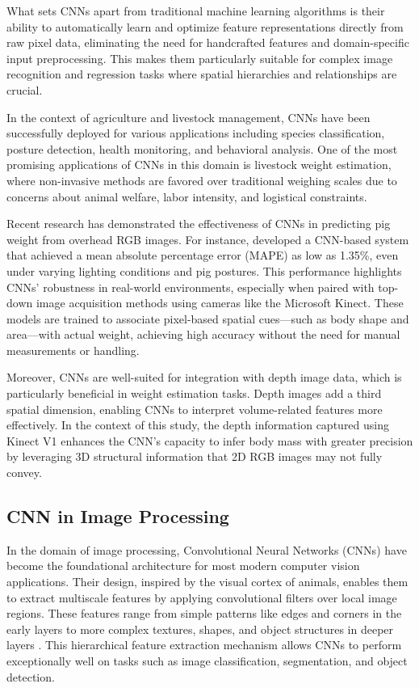 {What sets CNNs apart from traditional machine learning algorithms is their ability to automatically learn and optimize feature representations directly from raw pixel data, eliminating the need for handcrafted features and domain-specific input preprocessing. This makes them particularly suitable for complex image recognition and regression tasks where spatial hierarchies and relationships are crucial.

In the context of agriculture and livestock management, CNNs have been successfully deployed for various applications including species classification, posture detection, health monitoring, and behavioral analysis. One of the most promising applications of CNNs in this domain is livestock weight estimation, where non-invasive methods are favored over traditional weighing scales due to concerns about animal welfare, labor intensity, and logistical constraints.

Recent research has demonstrated the effectiveness of CNNs in predicting pig weight from overhead RGB images. For instance, \cite{pinto2024pig_weights} developed a CNN-based system that achieved a mean absolute percentage error (MAPE) as low as 1.35\%, even under varying lighting conditions and pig postures. This performance highlights CNNs' robustness in real-world environments, especially when paired with top-down image acquisition methods using cameras like the Microsoft Kinect. These models are trained to associate pixel-based spatial cues—such as body shape and area—with actual weight, achieving high accuracy without the need for manual measurements or handling.

Moreover, CNNs are well-suited for integration with depth image data, which is particularly beneficial in weight estimation tasks. Depth images add a third spatial dimension, enabling CNNs to interpret volume-related features more effectively. In the context of this study, the depth information captured using Kinect V1 enhances the CNN's capacity to infer body mass with greater precision by leveraging 3D structural information that 2D RGB images may not fully convey.

\subsection{CNN in Image Processing}

In the domain of image processing, Convolutional Neural Networks (CNNs) have become the foundational architecture for most modern computer vision applications. Their design, inspired by the visual cortex of animals, enables them to extract multiscale features by applying convolutional filters over local image regions. These features range from simple patterns like edges and corners in the early layers to more complex textures, shapes, and object structures in deeper layers \citep{krizhevsky2012imagenet}. This hierarchical feature extraction mechanism allows CNNs to perform exceptionally well on tasks such as image classification, segmentation, and object detection.

}
